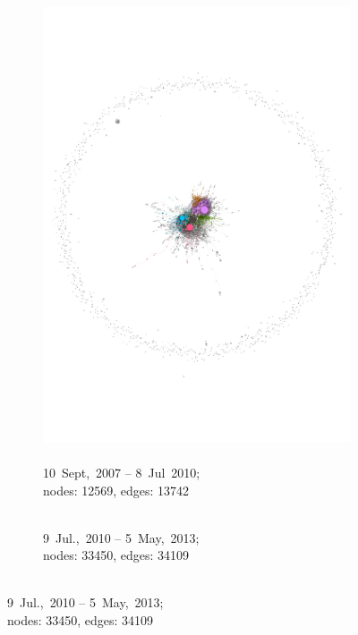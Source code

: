 \documentclass[
  a4paper,
  abstract=on,
  captions=tableabove
  ]{scrartcl}
\begin{document}
      \begin{figure}
        \captionsetup[subfigure]{justification=centering}
        \centering
        \begin{subfigure}{.45\linewidth}
          \caption{\\ 10~Sept,~2007 -- 8~Jul~2010;\\ nodes: \num{12569}, edges: \num{13742}}
          \label{subfig:net_diac_hyperlocal_one}
          \centering
          \includegraphics[width=\linewidth, height=\textheight, keepaspectratio]{img/net_hyperlocal_one.pdf}
        \end{subfigure}
        \begin{subfigure}{.45\linewidth}
          \caption{\\ 9~Jul.,~2010 -- 5~May,~2013;\\ nodes: \num{33450}, edges: \num{34109}}

\end{subfigure}
\end{figure}
\end{document}
